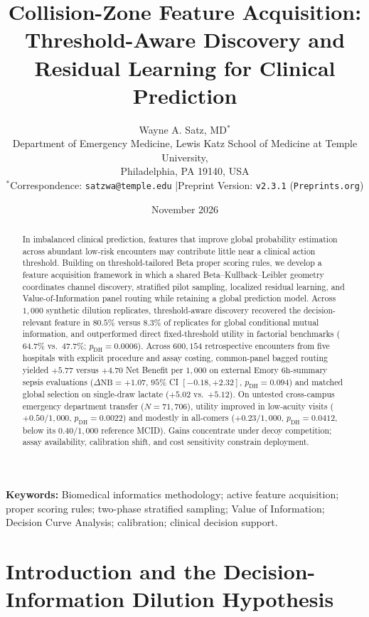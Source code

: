 \documentclass[11pt]{article}
\title{\textbf{Collision-Zone Feature Acquisition: Threshold-Aware Discovery and Residual Learning for Clinical Prediction}}
\author{
  Wayne A. Satz, MD$^*$\\
  \small Department of Emergency Medicine, Lewis Katz School of Medicine at Temple University,\\
  \small Philadelphia, PA 19140, USA\\
  \small $^*$Correspondence: \texttt{satzwa@temple.edu} \quad|\quad Preprint Version: \texttt{v2.3.1} (\texttt{Preprints.org})
}
\date{November 2026}
\begin{document}
\maketitle

\begin{abstract}
In imbalanced clinical prediction, features that improve global probability estimation across abundant low-risk encounters may contribute little near a clinical action threshold. Building on threshold-tailored Beta proper scoring rules, we develop a feature acquisition framework in which a shared Beta--Kullback--Leibler geometry coordinates channel discovery, stratified pilot sampling, localized residual learning, and Value-of-Information panel routing while retaining a global prediction model. Across $1{,}000$ synthetic dilution replicates, threshold-aware discovery recovered the decision-relevant feature in $80.5\%$ versus $8.3\%$ of replicates for global conditional mutual information, and outperformed direct fixed-threshold utility in factorial benchmarks ($64.7\%$ vs.\ $47.7\%$; $p_{\text{DH}}=0.0006$). Across $600{,}154$ retrospective encounters from five hospitals with explicit procedure and assay costing, common-panel bagged routing yielded $+5.77$ versus $+4.70$ Net Benefit per $1{,}000$ on external Emory $6\text{h}$-summary sepsis evaluations ($\Delta\text{NB}=+1.07$, $95\%$ CI $[-0.18, +2.32]$, $p_{\text{DH}}=0.094$) and matched global selection on single-draw lactate ($+5.02$ vs.\ $+5.12$). On untested cross-campus emergency department transfer ($N=71{,}706$), utility improved in low-acuity visits ($+0.50/1{,}000$, $p_{\text{DH}}=0.0022$) and modestly in all-comers ($+0.23/1{,}000$, $p_{\text{DH}}=0.0412$, below its $0.40/1{,}000$ reference MCID). Gains concentrate under decoy competition; assay availability, calibration shift, and cost sensitivity constrain deployment.
\end{abstract}

\vspace{4pt}
\noindent\textbf{Keywords:} Biomedical informatics methodology; active feature acquisition; proper scoring rules; two-phase stratified sampling; Value of Information; Decision Curve Analysis; calibration; clinical decision support.

\section{Introduction and the Decision-Information Dilution Hypothesis}
\label{sec:intro}
\end{document}
